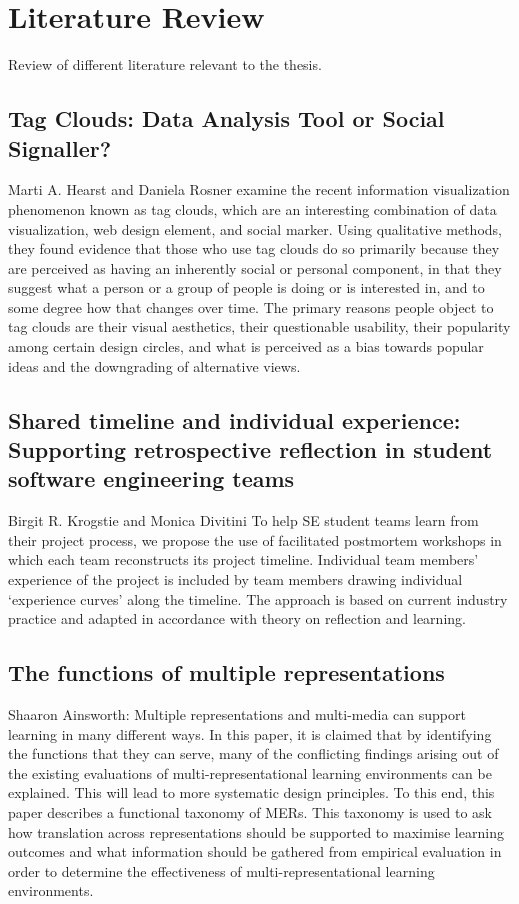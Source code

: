 \section{Literature Review}
Review of different literature relevant to the thesis.

\subsection{Tag Clouds: Data Analysis Tool or Social Signaller?}\cite{Hearst2008}
Marti A. Hearst and Daniela Rosner examine the recent information visualization phenomenon known as tag clouds, which are an interesting combination of data visualization, web design element, and social marker. Using qualitative methods, they found evidence that those who use tag clouds do so primarily because they are perceived as having an inherently social or personal component, in that they suggest what a person or a group of people is doing or is interested in, and to some degree how that changes over time. The primary reasons people object to tag clouds are their visual aesthetics, their questionable usability, their popularity among certain design circles, and what is perceived as a bias towards popular ideas and the downgrading of alternative views.

\subsection{Shared timeline and individual experience: Supporting retrospective reflection in student software engineering teams}\cite{Krogstie2009}
Birgit R. Krogstie and Monica Divitini To help SE student teams learn from their project process, we propose the use of facilitated postmortem workshops in which each team reconstructs its project timeline. Individual team members’ experience of the project is included by team members drawing individual ‘experience curves’ along the timeline. The approach is based on current industry practice and adapted in accordance with theory on reflection and learning.

\subsection{The functions of multiple representations}\cite{Ainsworth1999}
Shaaron Ainsworth: Multiple representations and multi-media can support learning in many different ways. In this paper, it is claimed that by identifying the functions that they can serve, many of the conflicting findings arising out of the existing evaluations of multi-representational learning environments can be explained. This will lead to more systematic design principles. To this end, this paper describes a functional taxonomy of MERs. This taxonomy is used to ask how translation across representations should be supported to maximise learning outcomes and what information should be gathered from empirical evaluation in order to determine the effectiveness of multi-representational learning environments.
